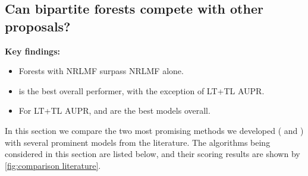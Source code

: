%     


\subsection{Can bipartite forests compete with other proposals?}
\label{sec:comparison literature}

\begin{mdframed}
    \textbf{Key findings:}
    \begin{itemize}
        \item Forests with NRLMF surpass NRLMF alone.
        \item {} is the best overall performer, with the exception of LT+TL AUPR. 
        \item For LT+TL AUPR,  and  are the best models overall.
    \end{itemize}
\end{mdframed}

In this section we compare the two most promising methods we developed ( and ) with several prominent models from the literature. 
%
The algorithms being considered in this section are listed below, and their scoring results are shown by \autoref{fig:comparison literature}.


